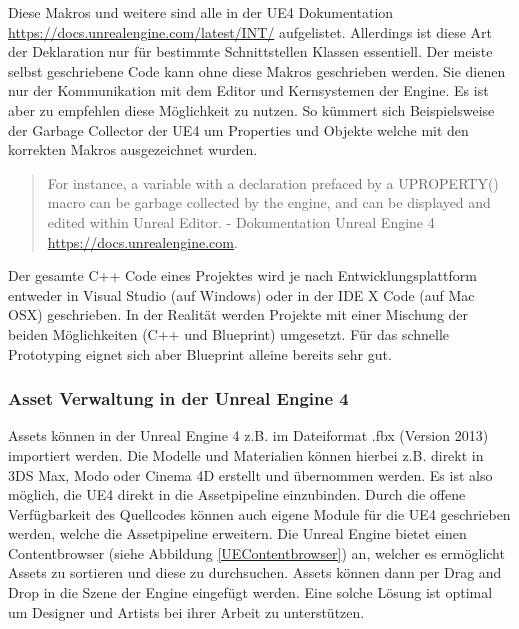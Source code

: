 \documentclass[pagesize, paper=a4, fontsize=12pt, titlepage=true, headings=small, headnosepline, abstractoff, liststotoc, nochapterprefix, plainheadsepline, twoside]{scrreprt}
\begin{document}


Diese Makros und weitere sind alle in der UE4 Dokumentation \url{https://docs.unrealengine.com/latest/INT/} aufgelistet. Allerdings ist diese Art der Deklaration nur für bestimmte Schnittstellen Klassen essentiell. Der meiste selbst geschriebene Code kann ohne diese Makros geschrieben werden. Sie dienen nur der Kommunikation mit dem Editor und Kernsystemen der Engine. Es ist aber zu empfehlen diese Möglichkeit zu nutzen. So kümmert sich Beispielsweise der Garbage Collector der UE4 um Properties und Objekte welche mit den korrekten Makros ausgezeichnet wurden. 
\begin{quote}
\glqq For instance, a variable with a declaration prefaced by a UPROPERTY() macro can be garbage collected by the engine, and can be displayed and edited within Unreal Editor.\grqq{} \autocite{UnrealEngine4} - Dokumentation Unreal Engine 4 \url{https://docs.unrealengine.com}.
\end{quote}
Der gesamte C++ Code eines Projektes wird je nach Entwicklungsplattform entweder in Visual Studio (auf Windows) oder in der IDE X Code (auf Mac OSX) geschrieben. In der Realität werden Projekte mit einer Mischung der beiden Möglichkeiten (C++ und Blueprint) umgesetzt. Für das schnelle Prototyping eignet sich aber Blueprint alleine bereits sehr gut.

\subsubsection{Asset Verwaltung in der Unreal Engine 4}
Assets können in der Unreal Engine 4 z.B. im Dateiformat .fbx (Version 2013) importiert werden. Die Modelle und Materialien können hierbei z.B. direkt in 3DS Max, Modo oder Cinema 4D erstellt und übernommen werden. Es ist also möglich, die UE4 direkt in die Assetpipeline einzubinden. Durch die offene Verfügbarkeit des Quellcodes können auch eigene Module für die UE4 geschrieben werden, welche die Assetpipeline erweitern. Die Unreal Engine bietet einen Contentbrowser (siehe Abbildung \ref{UEContentbrowser}) an, welcher es ermöglicht Assets zu sortieren und diese zu durchsuchen. Assets können dann per Drag and Drop in die Szene der Engine eingefügt werden. Eine solche Lösung ist optimal um Designer und Artists bei ihrer Arbeit zu unterstützen.
\end{document}
